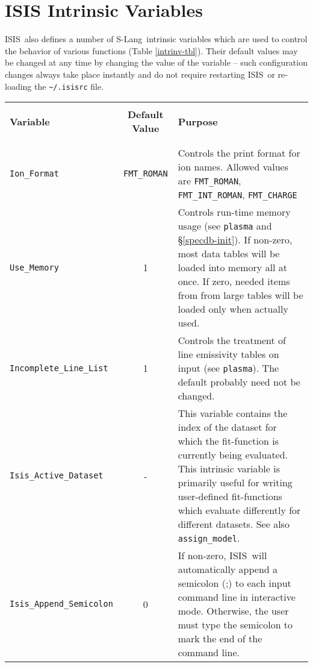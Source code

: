 \documentclass{book}
\newcommand{\isisx}{{\sc ISIS~}}
\newcommand{\isis}{{\sc ISIS}}
\newcommand{\slang}{{\sc S-Lang}}
\begin{document}
{\newpage
\section{ISIS Intrinsic Variables}
\label{sec:intrin-var}

\isisx also defines a number of \slang\ intrinsic variables which
are used to control the behavior of various functions (Table
\ref{intrinv-tbl}).  Their default values may be changed at any time by
changing the value of the variable -- such configuration changes always take
place instantly and do not require restarting \isisx or re-loading the
\verb|~/.isisrc| file.

\vspace*{-2cm}
\begin{center}
\label{intrinv-tbl} %
\begin{tabular}{|l|c|p{3.2in}|}
\hline
\rule[-1mm]{0mm}{1mm} & & \hfill \\
{\bf Variable} & {\bf Default Value} &  {\bf Purpose} \\
\rule[-1mm]{0mm}{1mm} & & \hfill \\
\hline
\rule[-1mm]{0mm}{1mm} & & \hfill \\
{\tt Ion\_Format}  & {\tt FMT\_ROMAN} & Controls the print format
for ion names. Allowed values are {\tt FMT\_ROMAN}, {\tt FMT\_INT\_ROMAN},
{\tt FMT\_CHARGE} \\
{\tt Use\_Memory} & 1 & Controls run-time memory usage (see {\tt plasma} and
\S\ref{specdb-init}). If non-zero, most data tables will be loaded into memory
all at once.  If zero, needed items from from large tables will be loaded
only when actually used.\\
{\tt Incomplete\_Line\_List} & 1 & Controls the treatment of line emissivity
tables on input (see {\tt plasma}). The default probably need not be changed.\\
{\tt Isis\_Active\_Dataset} & - & This variable contains the index of the
dataset for which the fit-function is currently being evaluated.  This
intrinsic variable is primarily useful for writing user-defined fit-functions
which evaluate differently for different datasets.  See also {\tt
assign\_model}.\\
{\tt Isis\_Append\_Semicolon} & 0 & If non-zero, \isis\ will
automatically append a semicolon (;) to each input command line
in interactive mode.  Otherwise, the user must type the semicolon
to mark the end of the command line.\index{{\tt Isis\_Append\_Semicolon}}\\

\end{tabular}
\end{center}}
\end{document}
